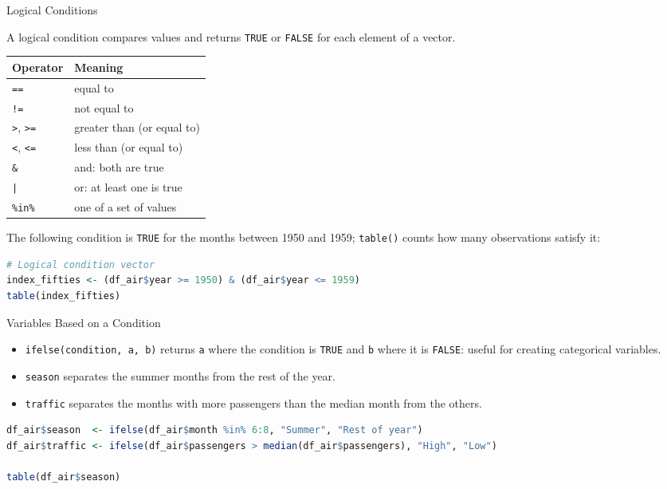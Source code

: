 \documentclass[9pt,aspectratio=169]{beamer}
\begin{document}
\begin{frame}[fragile]{Logical Conditions}
\linespread{1.3}\selectfont %

A logical condition compares values and returns \texttt{TRUE} or \texttt{FALSE} for each element of a vector.

\begin{center}
  \small
  \begin{tabular}{ll}
  \toprule
  \textbf{Operator} & \textbf{Meaning} \\
  \midrule
  \texttt{==} & equal to \\
  \texttt{!=} & not equal to \\
  \texttt{>}, \texttt{>=} & greater than (or equal to) \\
  \texttt{<}, \texttt{<=} & less than (or equal to) \\
  \texttt{\&} & and: both are true \\
  \texttt{|} & or: at least one is true \\
  \texttt{\%in\%} & one of a set of values \\
  \bottomrule
  \end{tabular}
\end{center}

\pause
The following condition is \texttt{TRUE} for the months between 1950 and 1959; \texttt{table()} counts how many observations satisfy it:
\begin{lstlisting}[language=R, basicstyle=\ttfamily\small]
# Logical condition vector
index_fifties <- (df_air$year >= 1950) & (df_air$year <= 1959)
table(index_fifties)
\end{lstlisting}
\end{frame}

\begin{frame}[fragile]{Variables Based on a Condition}

\begin{itemize}
  \item \texttt{ifelse(condition, a, b)} returns \texttt{a} where the condition is \texttt{TRUE} and \texttt{b} where it is \texttt{FALSE}: useful for creating categorical variables.
  \item \texttt{season} separates the summer months from the rest of the year.
  \item \texttt{traffic} separates the months with more passengers than the median month from the others.
\end{itemize}

\begin{lstlisting}[language=R, basicstyle=\ttfamily\scriptsize]
df_air$season  <- ifelse(df_air$month %in% 6:8, "Summer", "Rest of year")
df_air$traffic <- ifelse(df_air$passengers > median(df_air$passengers), "High", "Low")

table(df_air$season)
\end{lstlisting}
\end{frame}
\end{document}
